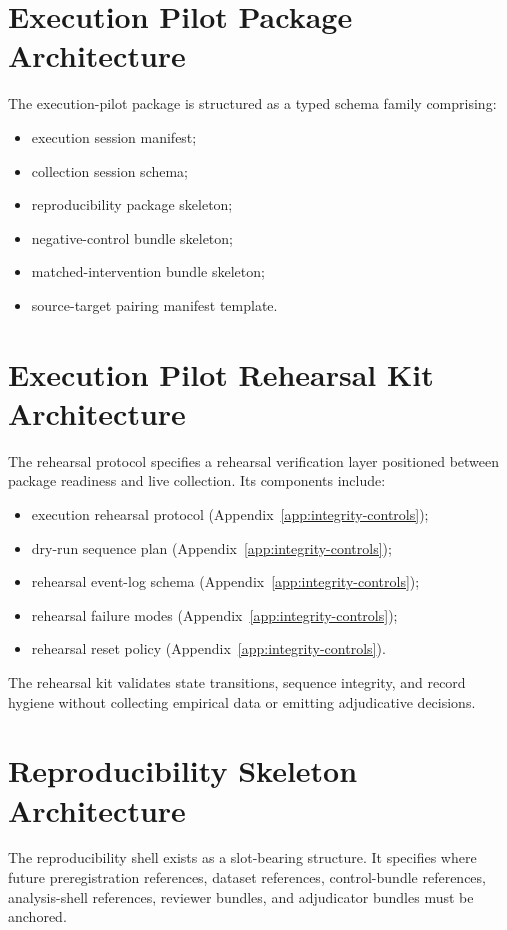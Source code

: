 \documentclass[11pt,a4paper]{article}
\begin{document}
\section{Execution Pilot Package Architecture}

The execution-pilot package is structured as a typed schema family comprising:

\begin{itemize}
\item execution session manifest;
\item collection session schema;
\item reproducibility package skeleton;
\item negative-control bundle skeleton;
\item matched-intervention bundle skeleton;
\item source-target pairing manifest template.
\end{itemize}

\section{Execution Pilot Rehearsal Kit Architecture}

The rehearsal protocol specifies a rehearsal verification layer positioned between package readiness and live collection. Its components include:

\begin{itemize}
\item execution rehearsal protocol (Appendix~\ref{app:integrity-controls});
\item dry-run sequence plan (Appendix~\ref{app:integrity-controls});
\item rehearsal event-log schema (Appendix~\ref{app:integrity-controls});
\item rehearsal failure modes (Appendix~\ref{app:integrity-controls});
\item rehearsal reset policy (Appendix~\ref{app:integrity-controls}).
\end{itemize}

The rehearsal kit validates state transitions, sequence integrity, and record hygiene without collecting empirical data or emitting adjudicative decisions.

\section{Reproducibility Skeleton Architecture}

The reproducibility shell exists as a slot-bearing structure. It specifies where
future preregistration references, dataset references, control-bundle
references, analysis-shell references, reviewer bundles, and adjudicator
bundles must be anchored.
\end{document}
